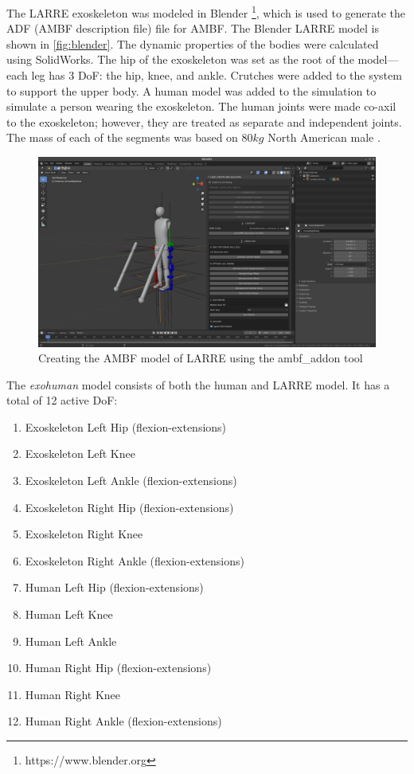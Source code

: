  The LARRE exoskeleton was modeled in Blender \footnote{https://www.blender.org}, which is used to generate the ADF (AMBF description file) file for AMBF. The Blender LARRE model is shown in \autoref{fig:blender}. The dynamic properties of the bodies were calculated using SolidWorks. The hip of the exoskeleton was set as the root of the model—each leg has 3 DoF: the hip, knee, and ankle. Crutches were added to the system to support the upper body. A human model was added to the simulation to simulate a person wearing the exoskeleton. The human joints were made co-axil to the exoskeleton; however, they are treated as separate and independent joints. The mass of each of the segments was based on $80kg$ North American male \cite{BMI} \cite{drillis1964body}.
 
 \begin{figure}[h]
     \centering
     \includegraphics[scale=0.2]{images/sim/blender.png}
     \caption[Blender Model of LARRE]{Creating the AMBF model of LARRE using the ambf\_addon tool}
     \label{fig:blender}
 \end{figure}
 
 
 The \textit{exohuman} model consists of both the human and LARRE model. It has a total of 12 active DoF:

\begin{enumerate}
  \item Exoskeleton Left Hip (flexion-extensions)
  \item Exoskeleton Left Knee
  \item Exoskeleton Left Ankle (flexion-extensions)
  \item Exoskeleton Right Hip (flexion-extensions)
  \item Exoskeleton Right Knee
  \item Exoskeleton Right Ankle (flexion-extensions)
  \item Human Left Hip (flexion-extensions)
  \item Human Left Knee
  \item Human Left Ankle
  \item Human Right Hip (flexion-extensions)
  \item Human Right Knee
  \item Human Right Ankle (flexion-extensions)
\end{enumerate}


